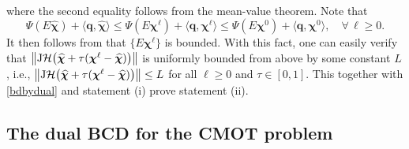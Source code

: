 \documentclass[10pt]{article}
\begin{document}
\begin{appendices}
\begin{equation}
\begin{aligned}
\end{aligned}
\end{equation}
where the second equality follows from the mean-value theorem. Note that
\begin{equation*}
\Psi(E\widehat{\bm{\chi}}) + \langle\bm{q},\widehat{\bm{\chi}}\rangle
\leq \Psi(E\bm{\chi}^\ell) + \langle\bm{q},\bm{\chi}^\ell\rangle
\leq \Psi(E\bm{\chi}^0) + \langle\bm{q},\bm{\chi}^0\rangle, \quad \forall\,\ell\geq0.
\end{equation*}
It then follows from \cite[Lemma 3.3]{lt1992convergence} that $\{E\bm{\chi}^\ell\}$ is bounded. With this fact, one can easily verify that $\left\|\mathrm{J}\mathcal{H}\big{(}\widehat{\bm{\chi}} + \tau(\bm{\chi}^\ell-\widehat{\bm{\chi}})\big{)}\right\|$ is uniformly bounded from above by some constant $L$, i.e., $\big{\|}\mathrm{J}\mathcal{H}\big{(}\widehat{\bm{\chi}} + \tau (\bm{\chi}^\ell-\widehat{\bm{\chi}})\big{)}\big{\|} \leq L$ for all $\ell\geq0$ and $\tau\in [0,1]$. This together with \eqref{bdbydual} and statement (i) prove statement (ii).






\subsection{The dual BCD for the CMOT problem}\label{apdCMOT}


\end{appendices}
\end{document}
